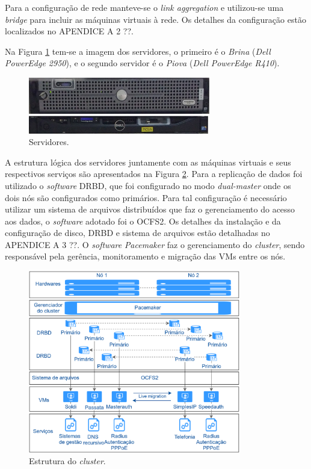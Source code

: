 Para a configuração de rede manteve-se o \textit{link aggregation} e utilizou-se uma \textit{bridge} para incluir as máquinas virtuais à rede.
Os detalhes da configuração estão localizados no APENDICE A 2 ??.

Na Figura \ref{fig:servidores_brina_piova} tem-se a imagem dos servidores, o primeiro é o \textit{Brina} (\textit{Dell PowerEdge 2950}), 
e o segundo servidor é o \textit{Piova} (\textit{Dell PowerEdge R410}).

\begin{figure}[h!]
 \centering
 \includegraphics[width=300px]{img/servidores_brina_piova.eps}
 \caption{Servidores.}
 \label{fig:servidores_brina_piova}
\end{figure}

A estrutura lógica dos servidores juntamente com as máquinas virtuais e seus respectivos serviços são apresentados na Figura 
\ref{fig:projeto_estrutura}. Para a replicação de dados foi utilizado o \textit{software} \ac{DRBD}, que foi configurado no modo 
\textit{dual-master} onde os dois nós são configurados como primários. Para tal configuração é necessário utilizar um sistema de arquivos 
distribuídos que faz o gerenciamento do acesso aos dados, o \textit{software} adotado foi o \ac{OCFS2}. 
Os detalhes da instalação e da configuração de disco, \ac{DRBD} e sistema de arquivos estão detalhadas no APENDICE A 3 ??. 
O \textit{software} \textit{Pacemaker} faz o gerenciamento do \textit{cluster}, sendo responsável pela gerência, monitoramento e migração das 
\acp{VM} entre os nós.

\begin{figure}[h!]
 \centering
 \includegraphics[width=350px]{img/projeto_estrutura.eps}
 \caption{Estrutura do \textit{cluster}.}
 \label{fig:projeto_estrutura}
\end{figure}

